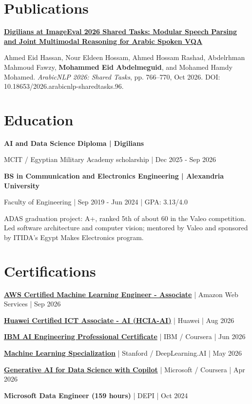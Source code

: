 \documentclass[11pt,letterpaper]{article}
\newcommand{\gap}{\vspace{5pt}}
\begin{document}
\section{Publications}
\textbf{\href{https://aclanthology.org/2026.arabicnlp-sharedtasks.96/}{Digilians at ImageEval 2026 Shared Tasks: Modular Speech Parsing and Joint Multimodal Reasoning for Arabic Spoken VQA}}\par
Ahmed Eid Hassan, Nour Eldeen Hossam, Ahmed Hossam Rashad, Abdelrhman Mahmoud Fawzy, \textbf{Mohammed Eid Abdelmeguid}, and Mohamed Hamdy Mohamed. \textit{ArabicNLP 2026: Shared Tasks}, pp. 766--770, Oct 2026. DOI: 10.18653/2026.arabicnlp-sharedtasks.96.

\section{Education}
\textbf{AI and Data Science Diploma | Digilians}\par
MCIT / Egyptian Military Academy scholarship | Dec 2025 - Sep 2026\par
\gap
\textbf{BS in Communication and Electronics Engineering | Alexandria University}\par
Faculty of Engineering | Sep 2019 - Jun 2024 | GPA: 3.13/4.0\par
ADAS graduation project: A+, ranked 5th of about 60 in the Valeo competition. Led software architecture and computer vision; mentored by Valeo and sponsored by ITIDA's Egypt Makes Electronics program.

\section{Certifications}
\href{https://aws.amazon.com/verification}{\textbf{AWS Certified Machine Learning Engineer - Associate}} | Amazon Web Services | Sep 2026\par
\href{https://e.huawei.com/en/talent/\#/cert/certificate-verification}{\textbf{Huawei Certified ICT Associate - AI (HCIA-AI)}} | Huawei | Aug 2026\par
\href{https://www.coursera.org/account/accomplishments/specialization/L3AI1XFNW950}{\textbf{IBM AI Engineering Professional Certificate}} | IBM / Coursera | Jun 2026\par
\href{https://www.coursera.org/account/accomplishments/specialization/BZQOVQR0HKXI}{\textbf{Machine Learning Specialization}} | Stanford / DeepLearning.AI | May 2026\par
\href{https://coursera.org/verify/9B7HT7WVGLJ0}{\textbf{Generative AI for Data Science with Copilot}} | Microsoft / Coursera | Apr 2026\par
\textbf{Microsoft Data Engineer (159 hours)} | DEPI | Oct 2024\par
\end{document}
